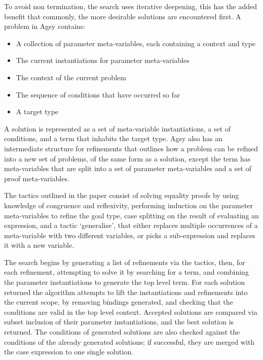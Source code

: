 \documentclass[a4paper]{article}
\begin{document}
To avoid non termination, the search uses iterative deepening, this has
the added benefit that commonly, the more desirable solutions are 
encountered first. A problem in Agsy contains:
\begin{itemize}
\item A collection of parameter meta-variables, each containing a context and type
\item The current instantiations for parameter meta-variables
\item The context of the current problem
\item The sequence of conditions that have occurred so far
\item A target type
\end{itemize}

A solution is represented as a set of meta-variable instantiations, a
set of conditions, and a term that inhabits the target type. Agsy also
has an intermediate structure for refinements that outlines how a 
problem can be refined into a new set of problems, of the same form as
a solution, except the term has meta-variables that are split into a 
set of parameter meta-variables and a set of proof meta-variables.

The tactics outlined in the paper consist of solving equality proofs by
using knowledge of congruence and reflexivity, performing induction on
the parameter meta-variables to refine the goal type, case splitting on
the result of evaluating an expression, and a tactic `generalise', that
either replaces multiple occurrences of a meta-variable with two 
different variables, or picks a sub-expression and replaces it with a
new variable. 

The search begins by generating a list of refinements via the tactics,
then, for each refinement, attempting to solve it by searching for a 
term, and combining the parameter instantiations to generate the top
level term. For each solution returned the algorithm attempts to lift 
the instantiations and refinements into the current scope, by removing
bindings generated, and checking that the conditions are valid in the
top level context. Accepted solutions are compared via subset inclusion
of their parameter instantiations, and the best solution is returned. 
The conditions of generated solutions are also checked against the 
conditions of the already generated solutions; if successful,
they are merged with the case expression to one single solution. 
\end{document}
